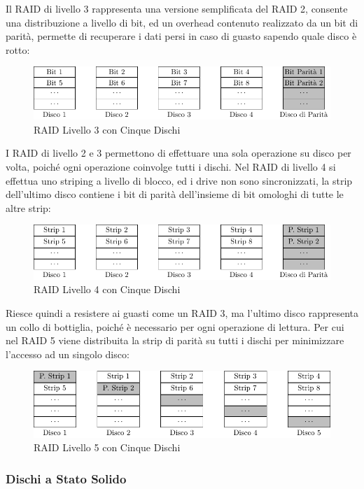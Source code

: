 \documentclass{article}
\numberwithin{equation}{subsection}
\begin{document}
Il RAID di livello 3 rappresenta una versione semplificata del RAID 2, consente una distribuzione a livello di bit, ed un overhead contenuto realizzato da un bit di parità, permette di recuperare i dati persi in caso di guasto sapendo quale 
disco è rotto: 
\begin{figure}[H]%
    \centering%
    \includegraphics{raid-3.pdf}%
    \caption{RAID Livello 3 con Cinque Dischi}%
\end{figure}
I RAID di livello 2 e 3 permettono di effettuare una sola operazione su disco per volta, poiché ogni operazione coinvolge tutti i dischi.  
Nel RAID di livello 4 si effettua uno striping a livello di blocco, ed i drive non sono sincronizzati, la strip dell'ultimo disco contiene i bit di parità dell'insieme di bit omologhi di tutte le altre strip:
\begin{figure}[H]%
    \centering%
    \includegraphics{raid-4.pdf}%
    \caption{RAID Livello 4 con Cinque Dischi}%
\end{figure}
Riesce 
quindi a resistere ai guasti come un RAID 3, ma l'ultimo disco rappresenta un collo di bottiglia, poiché è necessario per ogni operazione di lettura. Per cui nel RAID 5 viene distribuita la strip di parità su tutti i 
dischi per minimizzare l'accesso ad un singolo disco: 
\begin{figure}[H]%
    \centering%
    \includegraphics{raid-5.pdf}%
    \caption{RAID Livello 5 con Cinque Dischi}%
\end{figure}

\subsubsection{Dischi a Stato Solido}
\end{document}
